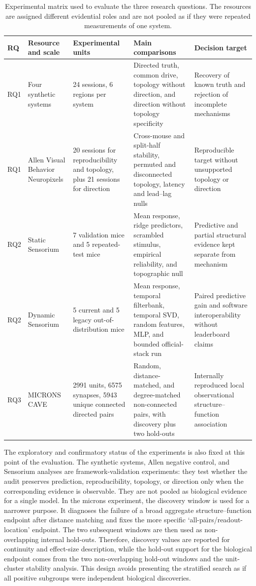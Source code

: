 \documentclass[a4paper,fleqn]{cas-sc}
\begin{document}
\begin{table}[t]
\centering
\caption{Experimental matrix used to evaluate the three research questions. The
resources are assigned different evidential roles and are not pooled as if they
were repeated measurements of one system.}
\label{tab:experimental-matrix}
\scriptsize
\begin{tabularx}{\textwidth}{@{}p{0.8cm}p{2.6cm}p{2.7cm}X X@{}}
\toprule
RQ & Resource and scale & Experimental units & Main comparisons & Decision target \\
\midrule
RQ1 & Four synthetic systems & 24 sessions, 6 regions per system & Directed truth, common drive, topology without direction, and direction without topology specificity & Recovery of known truth and rejection of incomplete mechanisms \\
RQ1 & Allen Visual Behavior Neuropixels & 20 sessions for reproducibility and topology, plus 21 sessions for direction & Cross-mouse and split-half stability, permuted and disconnected topology, latency and lead--lag nulls & Reproducible target without unsupported topology or direction \\
RQ2 & Static Sensorium & 7 validation mice and 5 repeated-test mice & Mean response, ridge predictors, scrambled stimulus, empirical reliability, and topographic null & Predictive and partial structural evidence kept separate from mechanism \\
RQ2 & Dynamic Sensorium & 5 current and 5 legacy out-of-distribution mice & Mean response, temporal filterbank, temporal SVD, random features, MLP, and bounded official-stack run & Paired predictive gain and software interoperability without leaderboard claims \\
RQ3 & MICRONS CAVE & 2991 units, 6575 synapses, 5943 unique connected directed pairs & Random, distance-matched, and degree-matched non-connected pairs, with discovery plus two hold-outs & Internally reproduced local observational structure--function association \\
\bottomrule
\end{tabularx}
\end{table}


The exploratory and confirmatory status of the experiments is also fixed at this
point of the evaluation. The synthetic systems, Allen negative control, and
Sensorium analyses are framework-validation experiments: they test whether the
audit preserves prediction, reproducibility, topology, or direction only when the
corresponding evidence is observable. They are not pooled as biological evidence
for a single model. In the \acs{microns} experiment, the discovery window is used
for a narrower purpose. It diagnoses the failure of a broad aggregate
structure--function endpoint after distance matching and fixes the more specific
`all-pairs/readout-location' endpoint. The two subsequent windows are then used
as non-overlapping internal hold-outs. Therefore, discovery values are reported
for continuity and effect-size description, while the hold-out support for
the biological endpoint comes from the two non-overlapping hold-out windows and
the unit-cluster stability analysis. This design avoids presenting the stratified
search as if all positive subgroups were independent biological discoveries.
\end{document}
